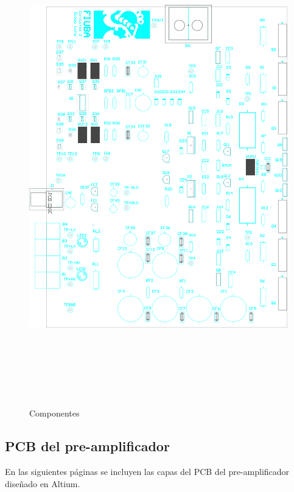 \begin{figure}[H]
    \centering
    \includegraphics[height=200mm, angle=0]{img/PCB/layers/amplifier/top-overlay.png}
    \caption\footnotesize{{Componentes}}
    \label{fig:pcb_amp_top_overlay}
\end{figure}

\clearpage





\subsection{PCB del pre-amplificador}

En las siguientes páginas se incluyen las capas del PCB del pre-amplificador diseñado en Altium.

